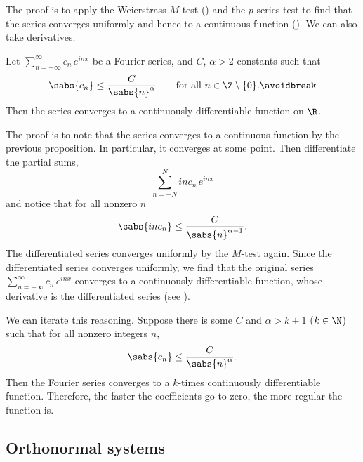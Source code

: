 The proof is to apply the Weierstrass $M$-test () and
the $p$-series test to find that the series converges uniformly and hence
to a continuous function ().
We can also take derivatives.

\begin{prop}
Let $\sum_{n=-\infty}^\infty c_n\, e^{inx}$ be a Fourier series,
and $C$, $\alpha > 2$ constants such that
\begin{equation*}
\sabs{c_n} \leq \frac{C}{\sabs{n}^\alpha}
\qquad \text{for all } n \in \Z \setminus \{ 0 \}.
\avoidbreak
\end{equation*}
Then the series converges to a continuously differentiable function on $\R$.
\end{prop}

The proof is to note that the series converges to a continuous
function by the previous proposition.
In particular, it converges at some point.
Then differentiate the partial sums,
\begin{equation*}
\sum_{n=-N}^{N}
i n c_n \,e^{inx}
\end{equation*}
and notice that for all nonzero $n$
\begin{equation*}
\sabs{i n c_n} \leq \frac{C}{\sabs{n}^{\alpha-1}} .
\end{equation*}
The differentiated series converges uniformly by the $M$-test again.  Since
the differentiated series
converges uniformly, we find that the original series
$\sum_{n=-\infty}^\infty c_n\,e^{inx}$
converges 
to a continuously differentiable function, whose derivative is
the differentiated series (see ).

We can iterate this reasoning.
Suppose there is
some $C$ and $\alpha > k+1$ ($k \in \N$) such that
for all nonzero integers $n$,
\begin{equation*}
\sabs{c_n} 
\leq \frac{C}{\sabs{n}^\alpha} .
\end{equation*}
Then 
the Fourier series converges to a $k$-times continuously differentiable
function.  Therefore, the faster the coefficients go to zero, the more
regular the function is.

\subsection{Orthonormal systems}

